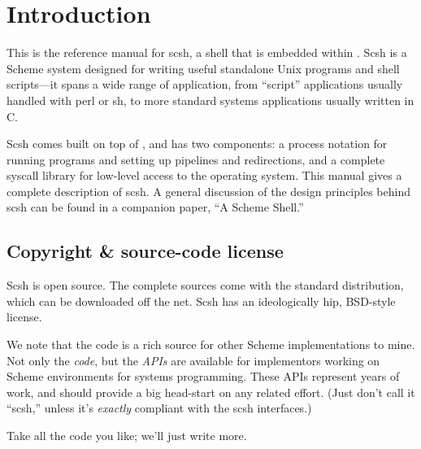 
\chapter{Introduction}

This is the reference manual for scsh, 
a {\Unix} shell that is embedded within {\Scheme}.
Scsh is a Scheme system designed for writing useful standalone Unix
programs and shell scripts---it spans a wide range of application,
from ``script'' applications usually handled with perl or sh,
to more standard systems applications usually written in C.

Scsh comes built on top of {\scm}, and has two components:
a process notation for running programs and setting up pipelines
and redirections, 
and a complete syscall library for low-level access to the operating system.
This manual gives a complete description of scsh.
A general discussion of the design principles behind scsh can be found
in a companion paper, ``A Scheme Shell.''

\section{Copyright \& source-code license}
Scsh is open source. The complete sources come with the standard
distribution, which can be downloaded off the net.
Scsh has an ideologically hip, BSD-style license.

We note that the code is a rich source for other Scheme implementations
to mine. Not only the \emph{code}, but the \emph{APIs} are available
for implementors working on Scheme environments for systems programming.
These APIs represent years of work, and should provide a big head-start
on any related effort. (Just don't call it ``scsh,'' unless it's
\emph{exactly} compliant with the scsh interfaces.)

Take all the code you like; we'll just write more.


